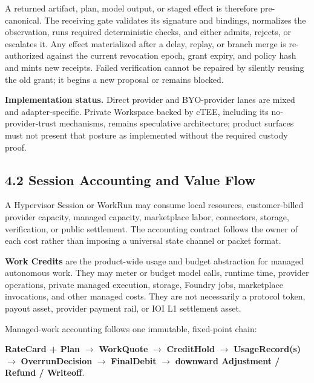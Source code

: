 \documentclass[
  11pt,
]{article}
\begin{document}
A returned artifact, plan, model output, or staged effect is therefore
pre-canonical. The receiving gate validates its signature and bindings,
normalizes the observation, runs required deterministic checks, and either
admits, rejects, or escalates it. Any effect materialized after a delay,
replay, or branch merge is re-authorized against the current revocation epoch,
grant expiry, and policy hash and mints new receipts. Failed verification
cannot be repaired by silently reusing the old grant; it begins a new proposal
or remains blocked.

\textbf{Implementation status.} Direct provider and BYO-provider lanes are
mixed and adapter-specific. Private Workspace backed by cTEE, including its
no-provider-trust mechanisms, remains speculative architecture; product
surfaces must not present that posture as implemented without the required
custody proof.
\hypertarget{session-accounting-and-value-flow}{%
\subsection{4.2 Session Accounting and Value
Flow}\label{session-accounting-and-value-flow}}

A Hypervisor Session or WorkRun may consume local resources, customer-billed
provider capacity, managed capacity, marketplace labor, connectors, storage,
verification, or public settlement. The accounting contract follows the owner
of each cost rather than imposing a universal state channel or packet format.

\textbf{Work Credits} are the product-wide usage and budget abstraction for
managed autonomous work. They may meter or budget model calls, runtime time,
provider operations, private managed execution, storage, Foundry jobs,
marketplace invocations, and other managed costs. They are not necessarily a
protocol token, payout asset, provider payment rail, or IOI L1 settlement
asset.

Managed-work accounting follows one immutable, fixed-point chain:

\begin{center}
\textbf{RateCard + Plan} $\rightarrow$ \textbf{WorkQuote}
$\rightarrow$ \textbf{CreditHold} $\rightarrow$
\textbf{UsageRecord(s)} $\rightarrow$ \textbf{OverrunDecision}
$\rightarrow$ \textbf{FinalDebit} $\rightarrow$
\textbf{downward Adjustment / Refund / Writeoff}.
\end{center}
\end{document}
